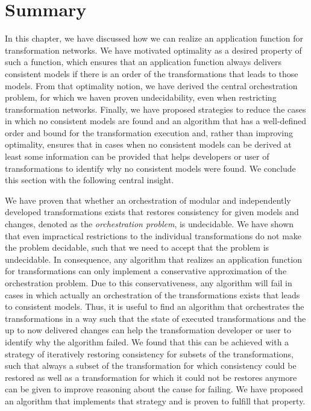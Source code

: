 \section{Summary}

In this chapter, we have discussed how we can realize an application function for transformation networks.
We have motivated optimality as a desired property of such a function, which ensures that an application function always delivers consistent models if there is an order of the transformations that leads to those models. 
From that optimality notion, we have derived the central orchestration problem, for which we haven proven undecidability, even when restricting transformation networks.
Finally, we have proposed strategies to reduce the cases in which no consistent models are found and an algorithm that has a well-defined order and bound for the transformation execution and, rather than improving optimality, ensures that in cases when no consistent models can be derived at least some information can be provided that helps developers or user of transformations to identify why no consistent models were found.
We conclude this section with the following central insight.

\begin{insight}[Orchestration]
    We have proven that whether an orchestration of modular and independently developed transformations exists that restores consistency for given models and changes, denoted as the \emph{orchestration problem}, is undecidable.
    We have shown that even impractical restrictions to the individual transformations do not make the problem decidable, such that we need to accept that the problem is undecidable.
    In consequence, any algorithm that realizes an application function for transformations can only implement a conservative approximation of the orchestration problem.
    Due to this conservativeness, any algorithm will fail in cases in which actually an orchestration of the transformations exists that leads to consistent models.
    Thus, it is useful to find an algorithm that orchestrates the transformations in a way such that the state of executed transformations and the up to now delivered changes can help the transformation developer or user to identify why the algorithm failed.
    We found that this can be achieved with a strategy of iteratively restoring consistency for subsets of the transformations, such that always a subset of the transformation for which consistency could be restored as well as a transformation for which it could not be restores anymore can be given to improve reasoning about the cause for failing.
    We have proposed an algorithm that implements that strategy and is proven to fulfill that property.
\end{insight}